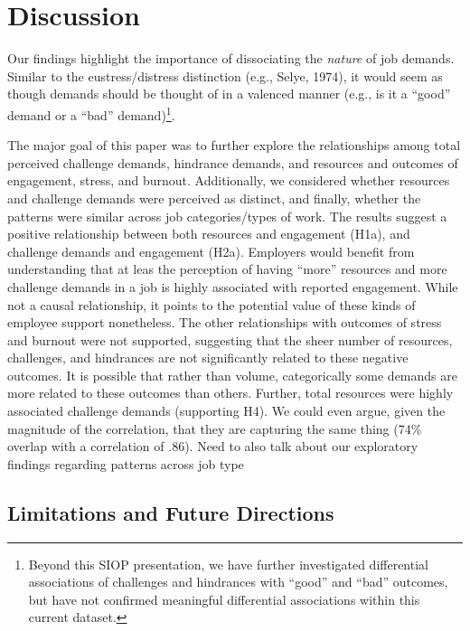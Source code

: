 \documentclass[
  man]{apa6}
\begin{document}
\hypertarget{discussion}{%
\section{Discussion}\label{discussion}}

Our findings highlight the importance of dissociating the \emph{nature} of job demands. Similar to the eustress/distress distinction (e.g., Selye, 1974), it would seem as though demands should be thought of in a valenced manner (e.g., is it a ``good'' demand or a ``bad'' demand)\footnote{Beyond this SIOP presentation, we have further investigated differential associations of challenges and hindrances with ``good'' and ``bad'' outcomes, but have not confirmed meaningful differential associations within this current dataset.}.

The major goal of this paper was to further explore the relationships among total perceived challenge demands, hindrance demands, and resources and outcomes of engagement, stress, and burnout. Additionally, we considered whether resources and challenge demands were perceived as distinct, and finally, whether the patterns were similar across job categories/types of work. The results suggest a positive relationship between both resources and engagement (H1a), and challenge demands and engagement (H2a). Employers would benefit from understanding that at leas the perception of having ``more'' resources and more challenge demands in a job is highly associated with reported engagement. While not a causal relationship, it points to the potential value of these kinds of employee support nonetheless. The other relationships with outcomes of stress and burnout were not supported, suggesting that the sheer number of resources, challenges, and hindrances are not significantly related to these negative outcomes. It is possible that rather than volume, categorically some demands are more related to these outcomes than others.
Further, total resources were highly associated challenge demands (supporting H4). We could even argue, given the magnitude of the correlation, that they are capturing the same thing (74\% overlap with a correlation of .86). Need to also talk about our exploratory findings regarding patterns across job type

\hypertarget{limitations-and-future-directions}{%
\subsection{Limitations and Future Directions}\label{limitations-and-future-directions}}
\end{document}
